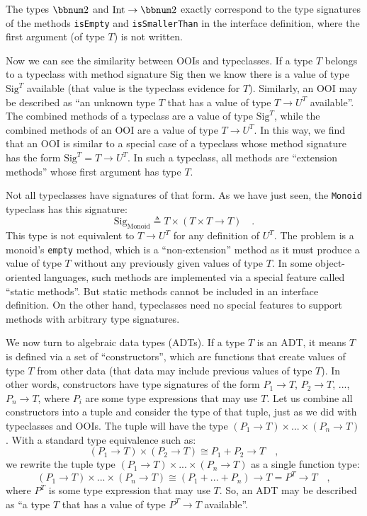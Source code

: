 The types $\bbnum 2$ and $\text{Int}\rightarrow\bbnum 2$ exactly
correspond to the type signatures of the methods \lstinline!isEmpty!
and \lstinline!isSmallerThan! in the interface definition, where
the first argument (of type $T$) is not written.

Now we can see the similarity between OOIs and typeclasses. If a type
$T$ belongs to a typeclass with method signature $\text{Sig}$ then
we know there is a value of type $\text{Sig}^{T}$ available (that
value is the typeclass evidence for $T$). Similarly, an OOI may be
described as \textsf{``}an unknown type $T$ that has a value of type $T\rightarrow U^{T}$
available\textsf{''}. The combined methods of a typeclass are a value of type
$\text{Sig}^{T}$, while the combined methods of an OOI are a value
of type $T\rightarrow U^{T}$. In this way, we find that an OOI is
similar to a special case of a typeclass whose method signature has
the form $\text{Sig}^{T}=T\rightarrow U^{T}$. In such a typeclass,
all methods are \textsf{``}extension methods\textsf{''} whose first argument has type
$T$.

Not all typeclasses have signatures of that form. As we have just
seen, the \lstinline!Monoid! typeclass has this signature: 
\[
\text{Sig}_{\text{Monoid}}\triangleq T\times(T\times T\rightarrow T)\quad.
\]
This type is not equivalent to $T\rightarrow U^{T}$ for any definition
of $U^{T}$. The problem is a monoid\textsf{'}s \lstinline!empty! method,
which is a \textsf{``}non-extension\textsf{''} method as it must produce a value of
type $T$ without any previously given values of type $T$. In some
object-oriented languages, such methods are implemented via a special
feature called \textsf{``}static methods\textsf{''}. But static methods cannot be
included in an interface definition. On the other hand, typeclasses
need no special features to support methods with arbitrary type signatures.

We now turn to algebraic data types (ADTs).
If a type $T$ is an ADT, it means $T$ is defined via a set of \textsf{``}constructors\textsf{''},
which are functions that create values of type $T$ from other data
(that data may include previous values of type $T$). In other words,
constructors have type signatures of the form $P_{1}\rightarrow T$,
$P_{2}\rightarrow T$, ..., $P_{n}\rightarrow T$, where $P_{i}$
are some type expressions that may use $T$. Let us combine all constructors
into a tuple and consider the type of that tuple, just as we did with
typeclasses and OOIs. The tuple will have the type $(P_{1}\rightarrow T)\times...\times(P_{n}\rightarrow T)$.
With a standard type equivalence such as:
\[
(P_{1}\rightarrow T)\times(P_{2}\rightarrow T)\cong P_{1}+P_{2}\rightarrow T\quad,
\]
we rewrite the tuple type $(P_{1}\rightarrow T)\times...\times(P_{n}\rightarrow T)$
as a single function type:
\[
(P_{1}\rightarrow T)\times...\times(P_{n}\rightarrow T)\cong(P_{1}+...+P_{n})\rightarrow T=P^{T}\rightarrow T\quad,
\]
where $P^{T}$ is some type expression that may use $T$. So, an ADT
may be described as \textsf{``}a type $T$ that has a value of type $P^{T}\rightarrow T$
available\textsf{''}. 

